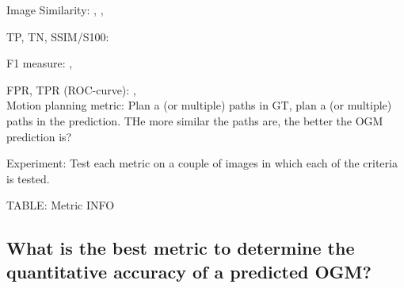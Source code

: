 Image Similarity: \cite{lange2020attention}, \cite{toyungyernsub2020double}, \cite{birk2006merging}

TP, TN, SSIM/S100: \cite{mohajerin2019multi}

F1 measure: \cite{dequaire2018deep}, \cite{schreiber2019long}

FPR, TPR (ROC-curve): \cite{hoermann2018dynamic}, \cite{schreiber2019long} \\

Motion planning metric: Plan a (or multiple) paths in GT, plan a (or multiple) paths in the prediction. THe more similar the paths are, the better the OGM prediction is?

Experiment: 
Test each metric on a couple of images in which each of the criteria is tested. 

TABLE:
Metric INFO



\subsection{What is the best metric to determine the quantitative accuracy of a predicted OGM?}


